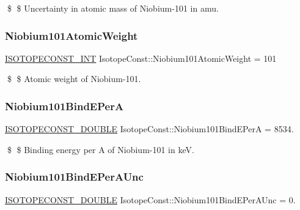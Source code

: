 \$ \$ Uncertainty in atomic mass of Niobium-\/101 in amu. \mbox{\label{group___isotope_const-_niobium-_nb101_ga790b311bf82951845d69d5a2b7cd77cf}} 
\subsubsection{\texorpdfstring{Niobium101\+Atomic\+Weight}{Niobium101AtomicWeight}}
{\footnotesize\ttfamily \mbox{\hyperlink{group___isotope_const-_macros_ga5f18360b3e99483a35c32d789e62621c}{I\+S\+O\+T\+O\+P\+E\+C\+O\+N\+S\+T\+\_\+\+I\+NT}} Isotope\+Const\+::\+Niobium101\+Atomic\+Weight = 101}

\$ \$ Atomic weight of Niobium-\/101. \mbox{\label{group___isotope_const-_niobium-_nb101_gab45f0d6be6c830a241f27c264ebce0d3}} 
\subsubsection{\texorpdfstring{Niobium101\+Bind\+E\+PerA}{Niobium101BindEPerA}}
{\footnotesize\ttfamily \mbox{\hyperlink{group___isotope_const-_macros_ga8f45a7272ce02c0b4c65c44636ed719a}{I\+S\+O\+T\+O\+P\+E\+C\+O\+N\+S\+T\+\_\+\+D\+O\+U\+B\+LE}} Isotope\+Const\+::\+Niobium101\+Bind\+E\+PerA = 8534.}

\$ \$ Binding energy per A of Niobium-\/101 in keV. \mbox{\label{group___isotope_const-_niobium-_nb101_ga3e1ae3850251a498f11116433d9fd00b}} 
\subsubsection{\texorpdfstring{Niobium101\+Bind\+E\+Per\+A\+Unc}{Niobium101BindEPerAUnc}}
{\footnotesize\ttfamily \mbox{\hyperlink{group___isotope_const-_macros_ga8f45a7272ce02c0b4c65c44636ed719a}{I\+S\+O\+T\+O\+P\+E\+C\+O\+N\+S\+T\+\_\+\+D\+O\+U\+B\+LE}} Isotope\+Const\+::\+Niobium101\+Bind\+E\+Per\+A\+Unc = 0.}

